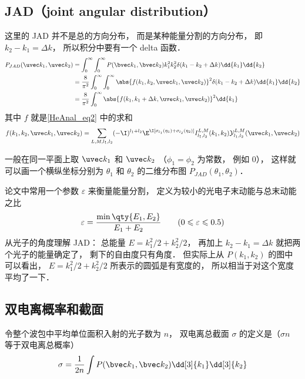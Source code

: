 \subsection{JAD（joint angular distribution）}
这里的 JAD 并不是总的方向分布， 而是某种能量分割的方向分布， 即 $k_2 - k_1 = \Delta k$， 所以积分中要有一个 delta 函数．
\begin{equation}
\begin{aligned}
P_{JAD}(\uvec k_1, \uvec k_2) &= \int_0^\infty \int_0^\infty P(\bvec k_1, \bvec k_2) k_1^2 k_2^2 \delta(k_1 - k_2 + \Delta k) \dd{k_1} \dd{k_2}\\
&= \frac{8}{\pi^2}\int_0^\infty \int_0^\infty \abs{f(k_1, k_2, \uvec k_1, \uvec k_2)}^2 \delta(k_1 - k_2 + \Delta k) \dd{k_1} \dd{k_2}\\
&= \frac{8}{\pi^2} \int_0^\infty \abs{f(k_1, k_1 + \Delta k, \uvec k_1, \uvec k_2)}^2 \dd{k_1}
\end{aligned}
\end{equation}
其中 $f$ 就是\autoref{HeAnal_eq2} 中的求和
\begin{equation}
f(k_1, k_2, \uvec k_1, \uvec k_2) = \sum_{L, M, l_1, l_2} (-\I)^{l_1 + l_2} \E^{\I [\sigma_{l_1}(\eta_1) + \sigma_{l_2} (\eta_2)]}  I_{l_1, l_2}^{L, M}(k_1, k_2) \mathcal{Y}_{l_1, l_2}^{L, M}(\uvec k_1, \uvec k_2)
\end{equation}

一般在同一平面上取 $\uvec k_1$ 和 $\uvec k_2$ （$\phi_1 = \phi_2$ 为常数， 例如 0）， 这样就可以画一个横纵坐标分别为 $\theta_1$ 和 $\theta_2$ 的二维分布图 $P_{JAD}(\theta_1, \theta_2)$．

论文中常用一个参数 $\varepsilon$ 来衡量能量分割， 定义为较小的光电子末动能与总末动能之比
\begin{equation}
\varepsilon = \frac{\min\qty{E_1, E_2}}{E_1 + E_2} \qquad (0 \leqslant \varepsilon \leqslant 0.5)
\end{equation}
从光子的角度理解 JAD： 总能量 $E = k_1^2/2 + k_2^2/2$， 再加上 $k_2 - k_1 = \Delta k$ 就把两个光子的能量确定了， 剩下的自由度只有角度． 但实际上从 $P(k_1, k_2)$ 的图中可以看出， $E = k_1^2/2 + k_2^2/2$ 所表示的圆弧是有宽度的， 所以相当于对这个宽度平均了一下．

\subsection{双电离概率和截面}
令整个波包中平均单位面积入射的光子数为 $n$， 双电离总截面 $\sigma$ 的定义是（$\sigma n$ 等于双电离总概率）
\begin{equation}
\sigma = \frac{1}{2n} \int P(\bvec k_1, \bvec k_2)\dd[3]{k_1}\dd[3]{k_2}
\end{equation}

